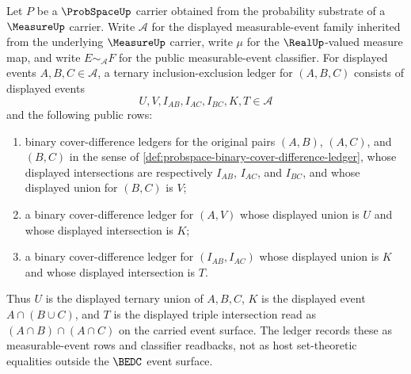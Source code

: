 \begin{definition}
\label{def:probspace-ternary-inclusion-exclusion-ledger}
Let $P$ be a $\ProbSpaceUp$ carrier obtained from the probability substrate of a $\MeasureUp$ carrier. Write $\mathcal A$ for the displayed measurable-event family inherited from the underlying $\MeasureUp$ carrier, write $\mu$ for the $\RealUp$-valued measure map, and write $E\sim_{\mathcal A}F$ for the public measurable-event classifier. For displayed events $A,B,C\in\mathcal A$, a ternary inclusion-exclusion ledger for $(A,B,C)$ consists of displayed events
$$
U,V,I_{AB},I_{AC},I_{BC},K,T\in\mathcal A
$$
and the following public rows:
\begin{enumerate}
\item binary cover-difference ledgers for the original pairs $(A,B)$, $(A,C)$, and $(B,C)$ in the sense of \autoref{def:probspace-binary-cover-difference-ledger}, whose displayed intersections are respectively $I_{AB}$, $I_{AC}$, and $I_{BC}$, and whose displayed union for $(B,C)$ is $V$;
\item a binary cover-difference ledger for $(A,V)$ whose displayed union is $U$ and whose displayed intersection is $K$;
\item a binary cover-difference ledger for $(I_{AB},I_{AC})$ whose displayed union is $K$ and whose displayed intersection is $T$.
\end{enumerate}
Thus $U$ is the displayed ternary union of $A,B,C$, $K$ is the displayed event $A\cap(B\cup C)$, and $T$ is the displayed triple intersection read as $(A\cap B)\cap(A\cap C)$ on the carried event surface. The ledger records these as measurable-event rows and classifier readbacks, not as host set-theoretic equalities outside the $\BEDC$ event surface.
\end{definition}

